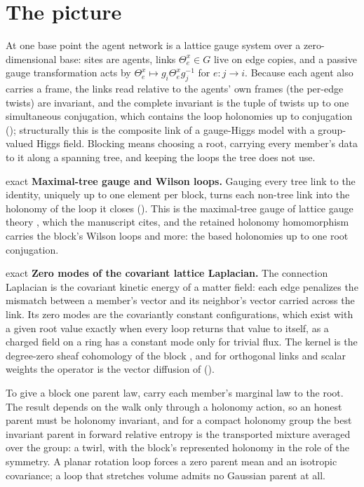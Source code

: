 \section{The picture}
\label{comp:ch10-picture}

At one base point the agent network is a lattice gauge system over a zero-dimensional base: sites are
agents, links $\Theta^x_e\in G$ live on edge copies, and a passive gauge transformation acts by
$\Theta^x_e\mapsto g_i\Theta^x_eg_j^{-1}$ for $e:j\to i$. Because each agent also carries a frame, the
links read relative to the agents' own frames (the per-edge twists) are invariant, and the complete
invariant is the tuple of twists up to one simultaneous conjugation, which contains the loop holonomies
up to conjugation (); structurally this is the composite link of a
gauge-Higgs model with a group-valued Higgs field. Blocking means choosing a root, carrying every
member's data to it along a spanning tree, and keeping the loops the tree does not use.

\begin{analogy}{exact}
\textbf{Maximal-tree gauge and Wilson loops.} Gauging every tree link to the identity, uniquely up to
one element per block, turns each non-tree link into the holonomy of the loop it closes
(). This is the maximal-tree gauge of lattice gauge theory \citep{Creutz1977},
which the manuscript cites, and the retained holonomy homomorphism carries the block's Wilson loops and
more: the based holonomies up to one root conjugation.
\end{analogy}

\begin{analogy}{exact}
\textbf{Zero modes of the covariant lattice Laplacian.} The connection Laplacian is the covariant
kinetic energy of a matter field: each edge penalizes the mismatch between a member's vector and its
neighbor's vector carried across the link. Its zero modes are the covariantly constant configurations,
which exist with a given root value exactly when every loop returns that value to itself, as a charged
field on a ring has a constant mode only for trivial flux. The kernel is the degree-zero sheaf cohomology
of the block \citep{HansenGhrist2019}, and for orthogonal links and scalar weights the operator is the
vector diffusion of \citet{SingerWu2012} ().
\end{analogy}

To give a block one parent law, carry each member's marginal law to the root. The result depends on the
walk only through a holonomy action, so an honest parent must be holonomy invariant, and for a compact
holonomy group the best invariant parent in forward relative entropy is the transported mixture averaged
over the group: a twirl, with the block's represented holonomy in the role of the symmetry. A planar
rotation loop forces a zero parent mean and an isotropic covariance; a loop that stretches volume admits
no Gaussian parent at all.

